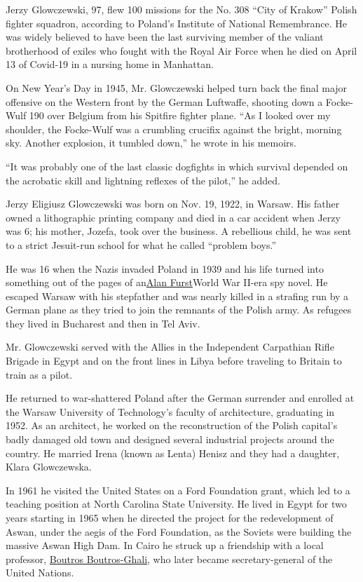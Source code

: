Jerzy Glowczewski, 97, flew 100 missions for the No. 308 ``City of
Krakow'' Polish fighter squadron, according to Poland's Institute of
National Remembrance. He was widely believed to have been the last
surviving member of the valiant brotherhood of exiles who fought with
the Royal Air Force when he died on April 13 of Covid-19 in a nursing
home in Manhattan.

On New Year's Day in 1945, Mr. Glowczewski helped turn back the final
major offensive on the Western front by the German Luftwaffe, shooting
down a Focke-Wulf 190 over Belgium from his Spitfire fighter plane. ``As
I looked over my shoulder, the Focke-Wulf was a crumbling crucifix
against the bright, morning sky. Another explosion, it tumbled down,''
he wrote in his memoirs.

``It was probably one of the last classic dogfights in which survival
depended on the acrobatic skill and lightning reflexes of the pilot,''
he added.

Jerzy Eligiusz Glowczewski was born on Nov. 19, 1922, in Warsaw. His
father owned a lithographic printing company and died in a car accident
when Jerzy was 6; his mother, Jozefa, took over the business. A
rebellious child, he was sent to a strict Jesuit-run school for what he
called ``problem boys.''

He was 16 when the Nazis invaded Poland in 1939 and his life turned into
something out of the pages of
an\href{https://www.nytimes3xbfgragh.onion/2016/06/05/books/review/alan-fursts-a-hero-of-france.html}{Alan
Furst}World War II-era spy novel. He escaped Warsaw with his stepfather
and was nearly killed in a strafing run by a German plane as they tried
to join the remnants of the Polish army. As refugees they lived in
Bucharest and then in Tel Aviv.

Mr. Glowczewski served with the Allies in the Independent Carpathian
Rifle Brigade in Egypt and on the front lines in Libya before traveling
to Britain to train as a pilot.

He returned to war-shattered Poland after the German surrender and
enrolled at the Warsaw University of Technology's faculty of
architecture, graduating in 1952. As an architect, he worked on the
reconstruction of the Polish capital's badly damaged old town and
designed several industrial projects around the country. He married
Irena (known as Lenta) Henisz and they had a daughter, Klara
Glowczewska.

In 1961 he visited the United States on a Ford Foundation grant, which
led to a teaching position at North Carolina State University. He lived
in Egypt for two years starting in 1965 when he directed the project for
the redevelopment of Aswan, under the aegis of the Ford Foundation, as
the Soviets were building the massive Aswan High Dam. In Cairo he struck
up a friendship with a local professor,
\href{https://www.nytimes3xbfgragh.onion/2016/02/17/world/boutros-boutros-ghali-death.html}{Boutros
Boutros-Ghali}, who later became secretary-general of the United
Nations.

